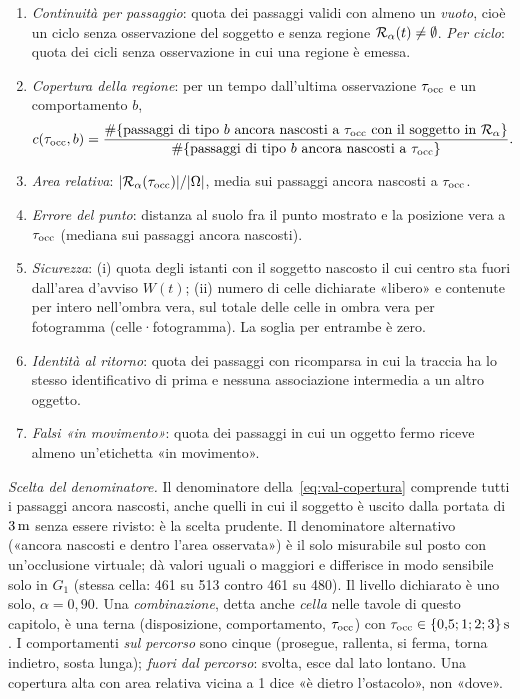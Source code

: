 \begin{definizione}[Misure]\label{def:val-misure}
\begin{enumerate}[label=(\alph*),itemsep=0pt]
\item \emph{Continuità per passaggio}: quota dei passaggi validi con almeno un \emph{vuoto}, cioè un ciclo senza osservazione del soggetto e senza regione $\mathcal{R}_\alpha(t)\neq\emptyset$. \emph{Per ciclo}: quota dei cicli senza osservazione in cui una regione è emessa.
\item \emph{Copertura della regione}: per un tempo dall'ultima osservazione $\tau_{\mathrm{occ}}$ e un comportamento $b$,
\begin{equation}\label{eq:val-copertura}
c(\tau_{\mathrm{occ}},b)=\frac{\#\{\text{passaggi di tipo } b \text{ ancora nascosti a } \tau_{\mathrm{occ}} \text{ con il soggetto in } \mathcal{R}_\alpha\}}{\#\{\text{passaggi di tipo } b \text{ ancora nascosti a } \tau_{\mathrm{occ}}\}} .
\end{equation}
\item \emph{Area relativa}: $|\mathcal{R}_\alpha(\tau_{\mathrm{occ}})|/|\Omega|$, media sui passaggi ancora nascosti a $\tau_{\mathrm{occ}}$.
\item \emph{Errore del punto}: distanza al suolo fra il punto mostrato e la posizione vera a $\tau_{\mathrm{occ}}$ (mediana sui passaggi ancora nascosti).
\item \emph{Sicurezza}: (i) quota degli istanti con il soggetto nascosto il cui centro sta fuori dall'area d'avviso $W(t)$; (ii) numero di celle dichiarate «libero» e contenute per intero nell'ombra vera, sul totale delle celle in ombra vera per fotogramma (celle·fotogramma). La soglia per entrambe è zero.
\item \emph{Identità al ritorno}: quota dei passaggi con ricomparsa in cui la traccia ha lo stesso identificativo di prima e nessuna associazione intermedia a un altro oggetto.
\item \emph{Falsi «in movimento»}: quota dei passaggi in cui un oggetto fermo riceve almeno un'etichetta «in movimento».
\end{enumerate}
\end{definizione}

\emph{Scelta del denominatore.} Il denominatore della~\eqref{eq:val-copertura} comprende tutti i passaggi ancora nascosti, anche quelli in cui il soggetto è uscito dalla portata di $3\,\mathrm{m}$ senza essere rivisto: è la scelta prudente. Il denominatore alternativo («ancora nascosti e dentro l'area osservata») è il solo misurabile sul posto con un'occlusione virtuale; dà valori uguali o maggiori e differisce in modo sensibile solo in $G_1$ (stessa cella: 461 su 513 contro 461 su 480). Il livello dichiarato è uno solo, $\alpha=0{,}90$. Una \emph{combinazione}, detta anche \emph{cella} nelle tavole di questo capitolo, è una terna (disposizione, comportamento, $\tau_{\mathrm{occ}}$) con $\tau_{\mathrm{occ}}\in\{0{,}5;1;2;3\}\,\mathrm{s}$. I comportamenti \emph{sul percorso} sono cinque (prosegue, rallenta, si ferma, torna indietro, sosta lunga); \emph{fuori dal percorso}: svolta, esce dal lato lontano. Una copertura alta con area relativa vicina a 1 dice «è dietro l'ostacolo», non «dove».

